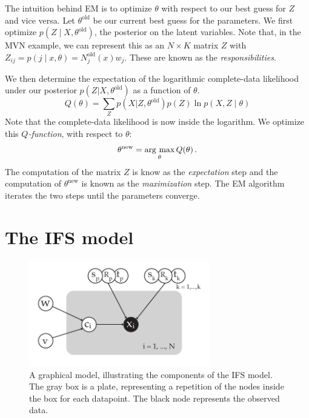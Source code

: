 The intuition behind EM is to optimize $\theta$ with respect to our best guess for $Z$ and vice versa. Let $\theta^\text{old}$ be our current best guess for the parameters. We first optimize $p(Z\mid X, \theta^\text{old})$, the posterior on the latent variables. Note that, in the MVN example, we can represent this as an $N\times K$ matrix $Z$ with $Z_{ij} = p(j\mid x,\theta) = N^\text{old}_j(x) w_j$. These are known as the \emph{responsibilities}.

We then determine the expectation of the logarithmic complete-data likelihood under  our posterior $p(Z|X, \theta^\text{old})$ as a function of $\theta$.
\[
Q(\theta) = \sum_Z p(X|Z, \theta^\text{old})p(Z) \ln p(X, Z \mid \theta)
\]  
Note that the complete-data likelihood is now inside the logarithm. We optimize this \emph{$Q$-function}, with respect to $\theta$:
\[
\theta^\text{new} = \operatorname*{\arg\,\max}_\theta Q(\theta)\,\text{.}
\]
 The computation of the matrix $Z$ is know as the \emph{expectation} step and the computation of $\theta^\text{new}$ is known as the \emph{maximization} step. The EM algorithm iterates the two steps until the parameters converge.

\section{The IFS model}

\begin{figure}[t]
  \center
  \includegraphics[width=0.7\textwidth]{./images/factor-graph.pdf}
  \caption{A graphical model, illustrating the components of the IFS model. The gray box is a plate, representing a repetition of the nodes inside the box for each datapoint. The black node represents the observed data.}
  \label{figure:ifs-diagram}
\end{figure}

